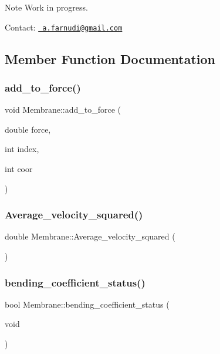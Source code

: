 \begin{DoxyNote}{Note}
Work in progress.
\end{DoxyNote}
Contact\+: \href{mailto:a.farnudi@gmail.com}{\texttt{ a.\+farnudi@gmail.\+com}} 

\subsection{Member Function Documentation}
\mbox{\label{classMembrane_a7524333ddca2039be9931fad57135fad}} 
\subsubsection{\texorpdfstring{add\_to\_force()}{add\_to\_force()}}
{\footnotesize\ttfamily void Membrane\+::add\+\_\+to\+\_\+force (\begin{DoxyParamCaption}\item[{double}]{force,  }\item[{int}]{index,  }\item[{int}]{coor }\end{DoxyParamCaption})\hspace{0.3cm}{\ttfamily [inline]}}

\mbox{\label{classMembrane_a27459fc890e1bc91b9decf1f24593863}} 
\subsubsection{\texorpdfstring{Average\_velocity\_squared()}{Average\_velocity\_squared()}}
{\footnotesize\ttfamily double Membrane\+::\+Average\+\_\+velocity\+\_\+squared (\begin{DoxyParamCaption}{ }\end{DoxyParamCaption})}

\mbox{\label{classMembrane_af1621cec0f4c59ded7978719e64c6d39}} 
\subsubsection{\texorpdfstring{bending\_coefficient\_status()}{bending\_coefficient\_status()}}
{\footnotesize\ttfamily bool Membrane\+::bending\+\_\+coefficient\+\_\+status (\begin{DoxyParamCaption}\item[{void}]{ }\end{DoxyParamCaption})\hspace{0.3cm}{\ttfamily [inline]}}

